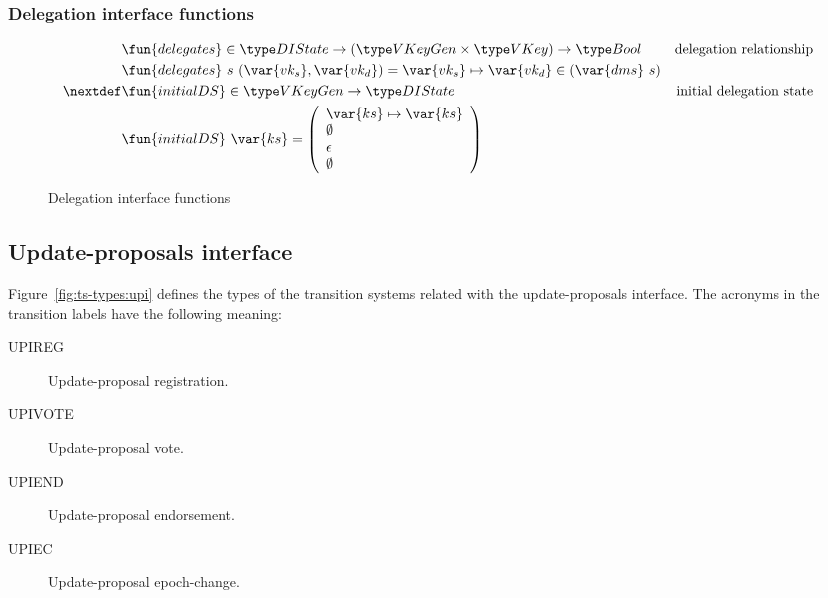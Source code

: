 \subsubsection{Delegation interface functions}
\label{sec:delegation-interface-functions}

\begin{figure}[htb]
  \begin{align*}
    & \fun{delegates} \in \DIState \to (\VKeyGen \times \VKey) \to \Bool & \text{delegation relationship}\\
    & \fun{delegates}~s~(\var{vk_s}, \var{vk_d}) = \var{vk_s} \mapsto \var{vk_d} \in (\var{dms}~s)\\
    \nextdef
    & \fun{initialDS} \in \VKeyGen \to \DIState & \text{initial delegation state}\\
    & \fun{initialDS}~\var{ks} =
      \left(
      \begin{array}{l}
        \var{ks} \mapsto \var{ks}\\
        \emptyset\\
        \epsilon\\
        \emptyset\\
      \end{array}
      \right)
  \end{align*}
  \caption{Delegation interface functions}
\end{figure}

\clearpage

\subsection{Update-proposals interface}
\label{sec:update-proposals-interface}

Figure~\ref{fig:ts-types:upi} defines the types of the transition systems
related with the update-proposals interface. The acronyms in the transition
labels have the following meaning:
\begin{description}
\item[UPIREG] Update-proposal registration.
\item[UPIVOTE] Update-proposal vote.
\item[UPIEND] Update-proposal endorsement.
\item[UPIEC] Update-proposal epoch-change.
\end{description}

